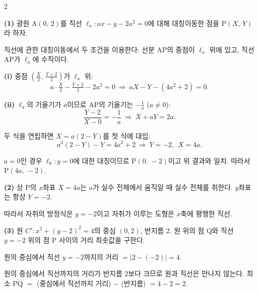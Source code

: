 \documentclass[10pt,fleqn]{article}
\renewcommand{\solpart}[1]{%
  \par\addvspace{10pt}\noindent
  {\sffamily\bfseries\color{black}(#1)}\hspace{3mm}\ignorespaces%
}
\renewcommand{\subcase}[1]{%
  \par\addvspace{6pt}\noindent
  {\sffamily\bfseries\color{black}(#1)}\hspace{2mm}\ignorespaces%
}
\begin{document}
\begin{multicols}{2}
\solpart{1} 광원 $\mathrm{A}(0,\,2)$를 직선 $\ell_{a}: ax - y - 2a^{2} = 0$에 대해 대칭이동한 점을 $\mathrm{P}(X,\,Y)$라 하자.

직선에 관한 대칭이동에서 두 조건을 이용한다: 선분 $\mathrm{AP}$의 중점이 $\ell_{a}$ 위에 있고, 직선 $\mathrm{AP}$가 $\ell_{a}$에 수직이다.

\subcase{i} 중점 $\left(\tfrac{X}{2},\,\tfrac{Y+2}{2}\right)$가 $\ell_{a}$ 위:
\[ a \cdot \tfrac{X}{2} - \tfrac{Y+2}{2} - 2a^{2} = 0 \ \Longrightarrow\ aX - Y - (4a^{2} + 2) = 0. \]

\subcase{ii} $\ell_{a}$의 기울기가 $a$이므로 $\mathrm{AP}$의 기울기는 $-\tfrac{1}{a}$ ($a \ne 0$):
\[ \frac{Y - 2}{X - 0} = -\frac{1}{a} \ \Longrightarrow\ X + aY = 2a. \]

두 식을 연립하면 $X = a(2 - Y)$를 첫 식에 대입:
\[ a^{2}(2 - Y) - Y = 4a^{2} + 2 \ \Longrightarrow\ Y = -2, \ \ X = 4a. \]

$a = 0$인 경우 $\ell_{0}: y = 0$에 대한 대칭이므로 $\mathrm{P}(0,\,-2)$이고 위 결과와 일치. 따라서 $\mathrm{P}(4a,\,-2)$.

\solpart{2} 상 $\mathrm{P}$의 $x$좌표 $X = 4a$는 $a$가 실수 전체에서 움직일 때 실수 전체를 취한다. $y$좌표는 항상 $Y = -2$.

따라서 자취의 방정식은 $y = -2$이고 자취가 이루는 도형은 $x$축에 평행한 직선.

\solpart{3} 원 $C': x^{2}+(y-2)^{2}=4$의 중심 $(0, 2)$, 반지름 $2$. 원 위의 점 $\mathrm{Q}$와 직선 $y=-2$ 위의 점 $\mathrm{P}$ 사이의 거리 최솟값을 구한다.

원의 중심에서 직선 $y=-2$까지의 거리 $= |2-(-2)| = 4$.

원의 중심에서 직선까지의 거리가 반지름 $2$보다 크므로 원과 직선은 만나지 않는다. 최소 $\overline{\mathrm{PQ}}$ $=$ (중심에서 직선까지 거리) $-$ (반지름) $= 4 - 2 = 2$.




\end{multicols}
\end{document}
